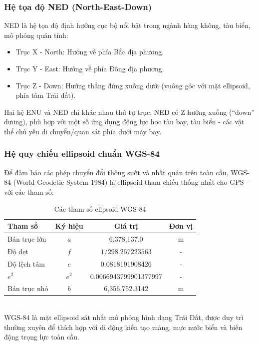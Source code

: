 \subsubsection{Hệ tọa độ NED (North-East-Down)}
NED là hệ tọa độ định hướng cục bộ nổi bật trong ngành hàng không, tàu biển, mô phỏng quán tính:
\begin{itemize}
    \item Trục X - North: Hướng về phía Bắc địa phương.
    \item Trục Y - East: Hướng về phía Đông địa phương.
    \item Trục Z - Down: Hướng thẳng đứng xuống dưới (vuông góc với mặt ellipsoid, phía tâm Trái đất).
\end{itemize}
Hai hệ ENU và NED chỉ khác nhau thứ tự trục: NED có Z hướng xuống (“down” dương), phù hợp với một số ứng dụng động lực học tàu bay, tàu biển - các vật thể chủ yếu di chuyển/quan sát phía dưới máy bay.
\newpage
\subsubsection{Hệ quy chiếu ellipsoid chuẩn WGS-84}
Để đảm bảo các phép chuyển đổi thông suốt và nhất quán trên toàn cầu, WGS-84 (World Geodetic System 1984) là ellipsoid tham chiếu thống nhất cho GPS - với các tham số: \\
\begin{table}[h!]
\centering
\begin{tabular}{|l|c|c|c|}
\hline
\textbf{Tham số}     & \textbf{Ký hiệu} & \textbf{Giá trị}        & \textbf{Đơn vị} \\ \hline
Bán trục lớn         & $a$              & 6,378,137.0             & m              \\ \hline
Độ dẹt               & $f$              & $1/298.257223563$       & -              \\ \hline
Độ lệch tâm          & $e$              & 0.0818191908426         & -              \\ \hline
$e^2$                & $e^2$            & 0.0066943799901377997        & -              \\ \hline
Bán trục nhỏ         & $b$              & 6,356,752.3142          & m              \\ \hline
\end{tabular}
\caption{Các tham số elipsoid WGS-84}
\end{table}
\\
WGS-84 là mặt ellipsoid sát nhất mô phỏng hình dạng Trái Đất, được duy trì thường xuyên để thích hợp với di động kiến tạo mảng, mực nước biển và biến động trọng lực toàn cầu.


